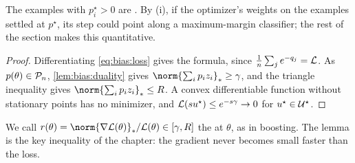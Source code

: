 \begin{refsection}
The examples with $p^\star_i>0$ are . By (i), if the optimizer's weights on the examples settled at $p^\star$, its step could point along a maximum-margin classifier; the rest of the section makes this quantitative.


\begin{proof}
Differentiating \eqref{eq:bias:loss} gives the formula, since $\frac1n\sum_je^{-q_j}=\mathcal{L}$. As $p(\theta)\in\mathcal{P}_n$, \cref{lem:bias:duality} gives $\norm{\sum_ip_iz_i}_*\ge\gamma$, and the triangle inequality gives $\norm{\sum_ip_iz_i}_*\le R$. A convex differentiable function without stationary points has no minimizer, and $\mathcal{L}(su^\star)\le e^{-s\gamma}\to0$ for $u^\star\in\mathcal{U}^\star$.
\end{proof}

We call $r(\theta)=\norm{\nabla\Loss(\theta)}_*/\Loss(\theta)\in[\gamma,R]$ the  at $\theta$, as in boosting. The lemma is the key inequality of the chapter: the gradient never becomes small faster than the loss.



\end{refsection}
